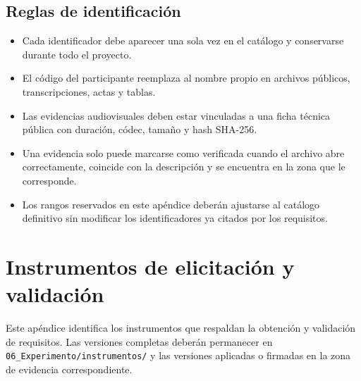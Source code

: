 \documentclass[12pt,a4paper]{article}
\begin{document}
\subsection{Reglas de identificación}

\begin{itemize}
  \item Cada identificador debe aparecer una sola vez en el catálogo y conservarse durante todo el proyecto.
  \item El código del participante reemplaza al nombre propio en archivos públicos, transcripciones, actas y tablas.
  \item Las evidencias audiovisuales deben estar vinculadas a una ficha técnica pública con duración, códec, tamaño y hash SHA-256.
  \item Una evidencia solo puede marcarse como verificada cuando el archivo abre correctamente, coincide con la descripción y se encuentra en la zona que le corresponde.
  \item Los rangos reservados en este apéndice deberán ajustarse al catálogo definitivo sin modificar los identificadores ya citados por los requisitos.
\end{itemize}

\section{Instrumentos de elicitación y validación}
\label{ap:instrumentos}

Este apéndice identifica los instrumentos que respaldan la obtención y validación de requisitos. Las versiones completas deberán permanecer en \nolinkurl{06_Experimento/instrumentos/} y las versiones aplicadas o firmadas en la zona de evidencia correspondiente.
\end{document}
